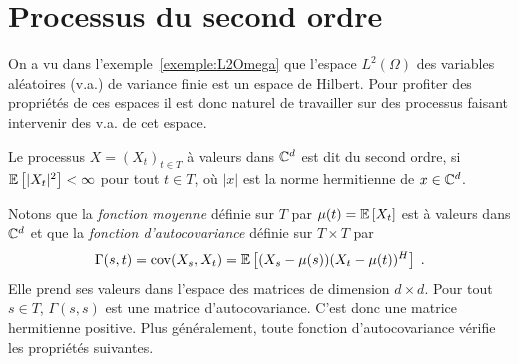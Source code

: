 \section{Processus du second ordre}
\label{sec:stat-second-ordre}

On a vu dans l'exemple~\ref{exemple:L2Omega} que l'espace $L^2(\Omega)$ des
variables al\'eatoires (v.a.) de variance finie est un espace de Hilbert.  Pour
profiter des propri\'et\'es de ces espaces il est donc naturel de travailler sur
des processus faisant intervenir des v.a. de cet espace.

\begin{definition}
Le processus $X=(X_t)_{t \in T}$ \`a valeurs dans $\mathbb{C}^d$ est dit
du second ordre, si ${\mathbb E}\left[ |X_t|^2 \right] < \infty$ pour tout $t\in T$, o\`u $|x|$
est la norme hermitienne de $x\in \mathbb{C}^d$.
\end{definition}
Notons que la \emph{fonction moyenne} d\'efinie sur $T$ par $\mu(t)= {\mathbb E}\left[ X_t \right]$
est \`a valeurs dans $\mathbb{C}^d$ et que la \emph{fonction d'autocovariance}
d\'efinie sur $T\times T$ par
\[
\Gamma(s,t)
   = \mathrm{cov}(X_s,X_t)
   = {\mathbb E}\left[ (X_s - \mu(s))(X_t-\mu(t))^H \right]\;.
\]
Elle prend ses valeurs dans l'espace des matrices de dimension $d\times d$. Pour tout $s\in T$, $\Gamma(s,s)$ est une matrice
d'autocovariance. C'est donc une matrice hermitienne positive. Plus
g\'en\'eralement, toute fonction d'autocovariance v\'erifie les propri\'et\'es
suivantes.


